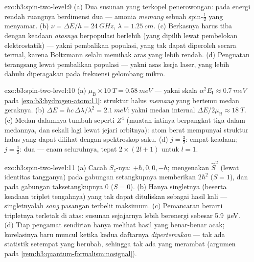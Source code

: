 \begin{solution}{exo:b3:spin-two-level:9}
(a) Dua susunan yang terkopel penerowongan: pada energi rendah ruangnya
berdimensi dua --- amonia \emph{memang} sebuah spin-$\tfrac12$ yang
menyamar. (b) $\nu = \Delta E/h = \qty{24}{GHz}$, $\lambda =
\qty{1.25}{cm}$. (c) Berkasnya harus tiba dengan keadaan \emph{atasnya}
berpopulasi berlebih (yang dipilih lewat pembelokan elektrostatik) ---
yakni pembalikan populasi, yang tak dapat diperoleh secara termal,
karena Boltzmann selalu memihak aras yang lebih rendah. (d) Penguatan
terangsang lewat pembalikan populasi --- yakni asas kerja laser, yang
lebih dahulu diperagakan pada frekuensi gelombang mikro.
\end{solution}

\begin{solution}{exo:b3:spin-two-level:10}
(a) $\mu_{\text{B}} \times \qty{10}{T} = \qty{0.58}{meV}$ --- yakni
skala $\alpha^2E_{\text{I}} \approx \qty{0.7}{meV}$ pada
\cref{exo:b3:hydrogen-atom:11}: struktur halus \emph{memang}  yang
bertemu medan geraknya. (b) $\Delta E = hc\,\Delta\lambda/
\lambda^2 = \qty{2.1}{meV}$: yakni medan internal $\Delta E/2\mu_{
\text{B}} \approx \qty{18}{T}$. (c) Medan dalamnya tumbuh seperti
$Z^4$ (muatan intinya berpangkat tiga dalam medannya, dan sekali lagi
lewat jejari orbitnya): atom berat mempunyai struktur halus yang dapat
dilihat dengan spektroskop saku. (d) $j = \tfrac32$: empat keadaan;
$j = \tfrac12$: dua --- enam seluruhnya, tepat $2 \times (2l + 1)$
untuk $l = 1$.
\end{solution}

\begin{solution}{exo:b3:spin-two-level:11}
(a) Cacah $S_z$-nya: $+\hbar, 0, 0, -\hbar$; mengenakan $\hat S^2$
(lewat identitas tangganya) pada gabungan setangkupnya memberikan
$2\hbar^2$ ($S = 1$), dan pada gabungan taksetangkupnya $0$ ($S = 0$). (b)
Hanya singletnya (beserta keadaan triplet tengahnya) yang tak dapat
dituliskan sebagai hasil kali --- singletnyalah \emph{sang} pasangan
terbelit maksimum. (c) Pemancaran berarti tripletnya terletak di atas: susunan
 sejajarnya lebih berenergi sebesar \qty{5.9}{\micro eV}. (d)
Tiap pengamat sendirian hanya melihat hasil yang benar-benar acak;
korelasinya baru muncul ketika kedua daftarnya \emph{dipertemukan} ---
tak ada statistik setempat yang berubah, sehingga tak ada yang merambat
(argumen pada \cref{rem:b3:quantum-formalism:nosignal}).
\end{solution}

